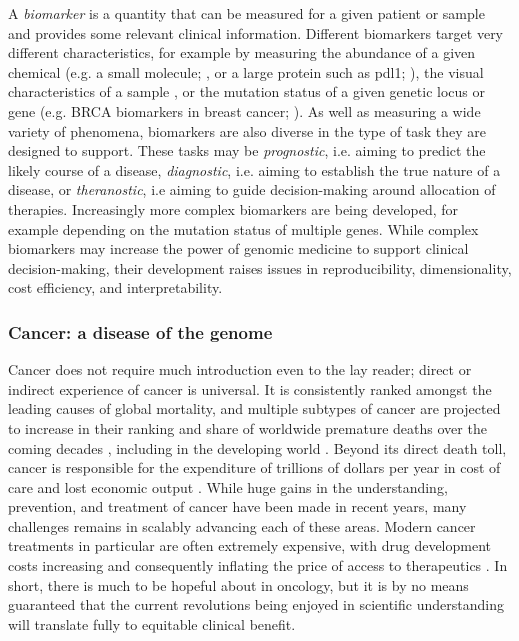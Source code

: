\documentclass[thesis.tex]{subfiles}
\begin{document}
A \emph{biomarker} is a quantity that can be measured for a given patient or sample and provides some relevant clinical information. Different biomarkers target very different characteristics, for example by measuring the abundance of a given chemical (e.g. a small molecule; \citealp{qiu_small_2023}, or a large protein such as \gls{pdl1}; \citealp{doroshow_pd-l1_2021}), the visual characteristics of a sample \citep{smith_biomarkers_2003}, or the mutation status of a given genetic locus or gene (e.g. BRCA biomarkers in breast cancer; \citealp{walsh_genomic_2016}). As well as measuring a wide variety of phenomena, biomarkers are also diverse in the type of task they are designed to support. These tasks may be \emph{prognostic}, i.e. aiming to predict the likely course of a disease, \emph{diagnostic}, i.e. aiming to establish the true nature of a disease, or \emph{theranostic}, i.e aiming to guide decision-making around allocation of therapies. Increasingly more complex biomarkers are being developed, for example depending on the mutation status of multiple genes. While complex biomarkers may increase the power of genomic medicine to support clinical decision-making, their development raises issues in reproducibility, dimensionality, cost efficiency, and interpretability.

\subsubsection{Cancer: a disease of the genome}
Cancer does not require much introduction even to the lay reader; direct or indirect experience of cancer is universal. It is consistently ranked amongst the leading causes of global mortality, and multiple subtypes of cancer are projected to increase in their ranking and share of worldwide premature deaths over the coming decades \citep{mathers_projections_2006}, including in the developing world \citep{kanavos_rising_2006}. Beyond its direct death toll, cancer is responsible for the expenditure of trillions of dollars per year in cost of care and lost economic output \citep{wild_world_2020}. While huge gains in the understanding, prevention, and treatment of cancer have been made in recent years, many challenges remains in scalably advancing each of these areas. Modern cancer treatments in particular are often extremely expensive, with drug development costs increasing and consequently inflating the price of access to therapeutics \citep{howard_pricing_2015}. In short, there is much to be hopeful about in oncology, but it is by no means guaranteed that the current revolutions being enjoyed in scientific understanding will translate fully to equitable clinical benefit.
\end{document}
